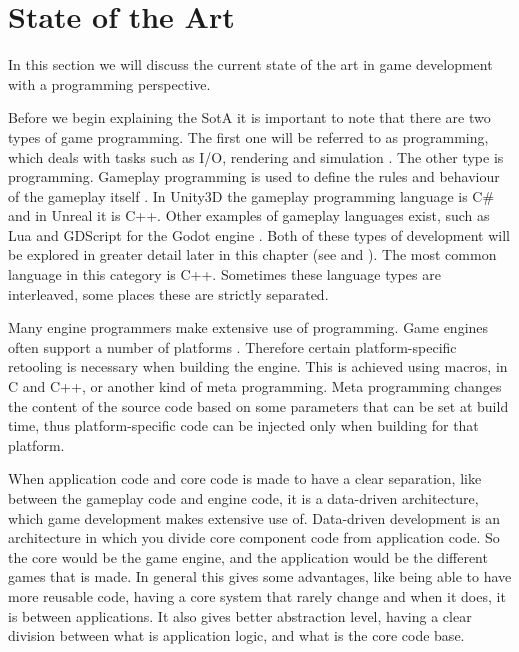 \chapter{State of the Art} \label{chap:state-of-the-art}
In this section we will discuss the current state of the art in game development with a programming perspective.

Before we begin explaining the \ac{SotA} it is important to note that there are two types of game programming. The first one will be referred to as \textit{} programming, which deals with tasks such as I/O, rendering and simulation \cite{blow2004game}. The other type is \textit{} programming. Gameplay programming is used to define the rules and behaviour of the gameplay itself \cite{blow2004game}. In Unity3D the gameplay programming language is C\# and in Unreal it is C++. Other examples of gameplay languages exist, such as Lua \cite{lua:about,gamedev:lua} and GDScript for the Godot engine \cite{godot:gdscript}. Both of these types of development will be explored in greater detail later in this chapter (see  and ). The most common language in this category is C++. Sometimes these language types are interleaved, some places these are strictly separated.

Many engine programmers make extensive use of \textit{} programming. Game engines often support a number of platforms \cite{BinSubaih2007ASO}. Therefore certain platform-specific retooling is necessary when building the engine. This is achieved using macros, in C and C++, or another kind of meta programming. Meta programming changes the content of the source code based on some parameters that can be set at build time, thus platform-specific code can be injected only when building for that platform.

When application code and core code is made to have a clear separation, like between the gameplay code and engine code, it is a data-driven architecture, which game development makes extensive use of. Data-driven development is an architecture in which you divide core component code from application code. So the core would be the game engine, and the application would be the different games that is made. In general this gives some advantages, like being able to have more reusable code, having a core system that rarely change and when it does, it is between applications. It also gives better abstraction level, having a clear division between what is application logic, and what is the core code base.

